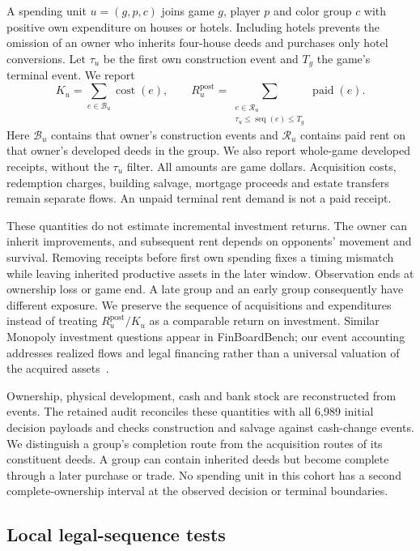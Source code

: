 A spending unit $u=(g,p,c)$ joins game $g$, player $p$ and color group $c$ with positive own expenditure on houses or hotels. Including hotels prevents the omission of an owner who inherits four-house deeds and purchases only hotel conversions. Let $\tau_u$ be the first own construction event and $T_g$ the game's terminal event. We report
\begin{equation}
 K_u=\sum_{e\in\mathcal{B}_u}\operatorname{cost}(e),
 \qquad
 R_u^{\mathrm{post}}=
 \sum_{\substack{e\in\mathcal{R}_u\\\tau_u\leq\operatorname{seq}(e)\leq T_g}}
 \operatorname{paid}(e).
 \label{eq:sol-receipts}
\end{equation}
Here $\mathcal{B}_u$ contains that owner's construction events and $\mathcal{R}_u$ contains paid rent on that owner's developed deeds in the group. We also report whole-game developed receipts, without the $\tau_u$ filter. All amounts are game dollars. Acquisition costs, redemption charges, building salvage, mortgage proceeds and estate transfers remain separate flows. An unpaid terminal rent demand is not a paid receipt.

These quantities do not estimate incremental investment returns. The owner can inherit improvements, and subsequent rent depends on opponents' movement and survival. Removing receipts before first own spending fixes a timing mismatch while leaving inherited productive assets in the later window. Observation ends at ownership loss or game end. A late group and an early group consequently have different exposure. We preserve the sequence of acquisitions and expenditures instead of treating $R_u^{\mathrm{post}}/K_u$ as a comparable return on investment. Similar Monopoly investment questions appear in FinBoardBench; our event accounting addresses realized flows and legal financing rather than a universal valuation of the acquired assets~\cite{hu2026finboardbench}.

Ownership, physical development, cash and bank stock are reconstructed from events. The retained audit reconciles these quantities with all 6,989 initial decision payloads and checks construction and salvage against cash-change events. We distinguish a group's completion route from the acquisition routes of its constituent deeds. A group can contain inherited deeds but become complete through a later purchase or trade. No spending unit in this cohort has a second complete-ownership interval at the observed decision or terminal boundaries.

\subsection{Local legal-sequence tests}

